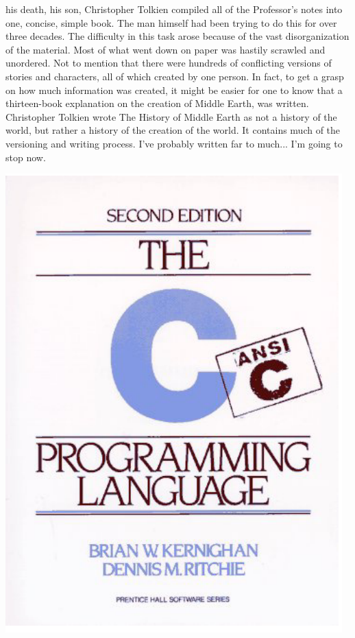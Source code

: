 \documentclass{article}
\begin{document}
his death, his son, Christopher Tolkien compiled all of the Professor's notes
into one, concise, simple book. The man himself had been trying to do this for
over three decades. The difficulty in this task arose because of the vast
disorganization of the material. Most of what went down on paper was hastily
scrawled and unordered. Not to mention that there were hundreds of conflicting
versions of stories and characters, all of which created by one person. In fact,
to get a grasp on how much information was created, it might be easier for one
to know that a thirteen-book explanation on the creation of Middle Earth, was
written. Christopher Tolkien wrote The History of Middle Earth as not a history
of the world, but rather a history of the creation of the world. It contains
much of the versioning and writing process. I've probably written far to
much... I'm going to stop now.

\pagebreak{}
\includegraphics[width=\textwidth]{images/the-c-programming-language.png}
\end{document}
